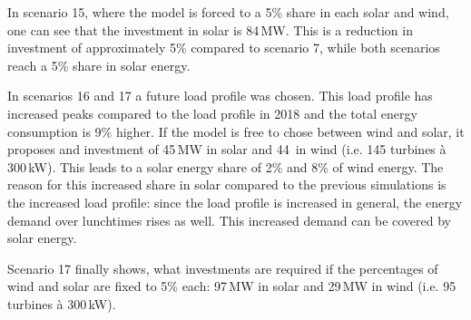 In scenario 15, where the model is forced to a 5\% share in each solar and wind, one can see that the investment in solar is 84\,MW. This is a reduction in investment of approximately 5\% compared to scenario 7, while both scenarios reach a 5\% share in solar energy. 

In scenarios 16 and 17 a future load profile was chosen. This load profile has increased peaks compared to the load profile in 2018 and the total energy consumption is 9\% higher. If the model is free to chose between wind and solar, it proposes and investment of 45\,MW in solar and 44\, in wind (i.e. 145 turbines à 300\,kW). This leads to a solar energy share of 2\% and 8\% of wind energy. The reason for this increased share in solar compared to the previous simulations is the increased load profile: since the load profile is increased in general, the energy demand over lunchtimes rises as well. This increased demand can be covered by solar energy. 

Scenario 17 finally shows, what investments are required if the percentages of wind and solar are fixed to 5\% each: 97\,MW in solar and 29\,MW in wind (i.e. 95 turbines à 300\,kW). 

